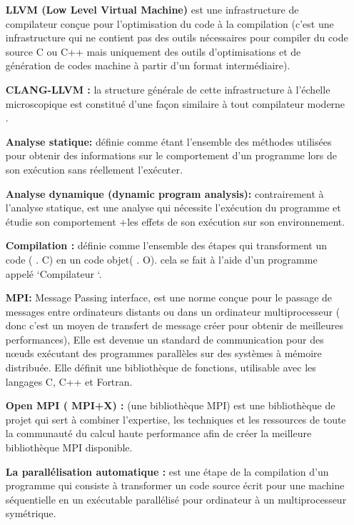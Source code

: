 \documentclass[12pt,titlepage]{article}
\begin{document}
\begin{itemize}
	

\item[\textbf{ LLVM (Low Level Virtual Machine)}] est une infrastructure de compilateur conçue pour l'optimisation du code à la compilation (c’est une infrastructure qui ne contient pas des outils nécessaires pour compiler du code source C ou C++ mais uniquement des outils d’optimisations et de génération de codes machine à partir d’un format intermédiaire).
              
\item[\textbf{CLANG-LLVM :}] la structure générale de cette infrastructure à l’échelle microscopique est constitué d’une façon similaire à tout compilateur moderne .

\item[\textbf{ Analyse statique:}] définie comme étant l'ensemble des méthodes utilisées pour obtenir des informations sur le comportement d’un programme lors de son exécution sans réellement l’exécuter.

\item[\textbf{  Analyse dynamique (dynamic program analysis): }] contrairement à l’analyse statique, est une analyse qui nécessite l’exécution du programme et étudie son comportement +les effets de son exécution sur son environnement.

\item[\textbf{ Compilation : }] définie comme l’ensemble des étapes qui transforment un code ( . C) en un code objet( . O). cela se fait à l’aide d’un programme appelé ‘Compilateur ‘.

\item[\textbf{ MPI:}] Message Passing interface, est une norme conçue pour le passage de messages entre ordinateurs distants ou dans un ordinateur multiprocesseur ( donc c’est un moyen de transfert de message créer pour obtenir de meilleures performances), Elle est devenue un standard de communication pour des nœuds exécutant des programmes parallèles sur des systèmes à mémoire distribuée. Elle définit une bibliothèque de fonctions, utilisable avec les langages C, C++ et Fortran.

\item[\textbf{ Open MPI ( MPI+X) :}] (une bibliothèque MPI) est une bibliothèque de projet qui sert à combiner l'expertise, les techniques et les ressources de toute la communauté du calcul haute performance afin de créer la meilleure bibliothèque MPI disponible.


\item[\textbf{ La parallélisation automatique :}] est une étape de la compilation d'un programme qui consiste à transformer un code source écrit pour une machine séquentielle en un exécutable parallélisé pour ordinateur à un multiprocesseur symétrique.


\end{itemize}
\end{document}
